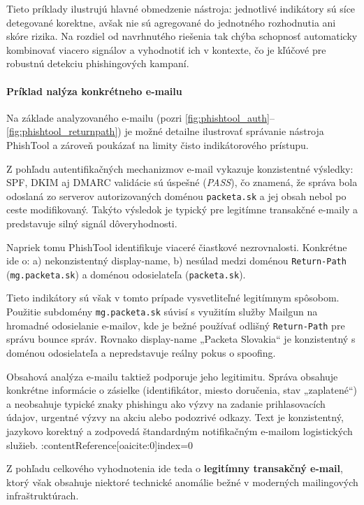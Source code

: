 \documentclass[conference]{IEEEtran}
\begin{document}
Tieto príklady ilustrujú hlavné obmedzenie nástroja: jednotlivé indikátory sú síce detegované korektne, avšak nie sú agregované do jednotného rozhodnutia ani skóre rizika. Na rozdiel od navrhnutého riešenia tak chýba schopnosť automaticky kombinovať viacero signálov a vyhodnotiť ich v kontexte, čo je kľúčové pre robustnú detekciu phishingových kampaní.

\paragraph{Príklad nalýza konkrétneho e-mailu}

Na základe analyzovaného e-mailu (pozri \ref{fig:phishtool_auth}--\ref{fig:phishtool_returnpath}) je možné detailne ilustrovať správanie nástroja PhishTool a zároveň poukázať na limity čisto indikátorového prístupu.

Z pohľadu autentifikačných mechanizmov e-mail vykazuje konzistentné výsledky:
SPF, DKIM aj DMARC validácie sú úspešné (\textit{PASS}), čo znamená,
že správa bola odoslaná zo serverov autorizovaných doménou
\texttt{packeta.sk} a jej obsah nebol po ceste modifikovaný.
Takýto výsledok je typický pre legitímne transakčné e-maily a
predstavuje silný signál dôveryhodnosti.

Napriek tomu PhishTool identifikuje viaceré čiastkové nezrovnalosti.
Konkrétne ide o:
a) nekonzistentný display-name,
b) nesúlad medzi doménou \texttt{Return-Path} (\texttt{mg.packeta.sk})
a doménou odosielateľa (\texttt{packeta.sk}).

Tieto indikátory sú však v tomto prípade vysvetliteľné legitímnym spôsobom.
Použitie subdomény \texttt{mg.packeta.sk} súvisí s využitím služby
Mailgun na hromadné odosielanie e-mailov, kde je bežné používať
odlišný \texttt{Return-Path} pre správu bounce správ.
Rovnako display-name „Packeta Slovakia“ je konzistentný s doménou
odosielateľa a nepredstavuje reálny pokus o spoofing.

Obsahová analýza e-mailu taktiež podporuje jeho legitimitu.
Správa obsahuje konkrétne informácie o zásielke (identifikátor,
miesto doručenia, stav „zaplatené“) a neobsahuje typické znaky
phishingu ako výzvy na zadanie prihlasovacích údajov, urgentné
výzvy na akciu alebo podozrivé odkazy.
Text je konzistentný, jazykovo korektný a zodpovedá štandardným
notifikačným e-mailom logistických služieb. :contentReference[oaicite:0]{index=0}

Z pohľadu celkového vyhodnotenia ide teda o \textbf{legitímny transakčný e-mail},
ktorý však obsahuje niektoré technické anomálie bežné v moderných
mailingových infraštruktúrach.
\end{document}
